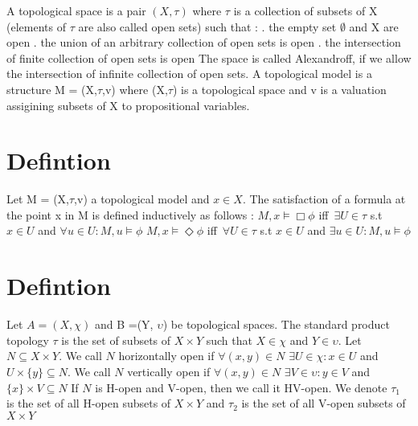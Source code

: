 \documentclass[12pt, a4paper]{scrreprt}
\begin{document}
A topological space is a pair $(X, \tau)$ where $\tau$ is a collection of subsets of X (elements of $\tau$ are also called open sets) such that : 
\newline
{}. the empty set $\emptyset $ and X are open
. the union of an arbitrary collection of open sets is open
. the intersection of finite collection of open sets is open
\newline
\newline
The space is called Alexandroff, if we allow the intersection of infinite collection of open sets.
A topological model is a structure M = (X,$\tau$,v) where (X,$\tau$) is a topological space
and v is a valuation assigining subsets of X to propositional variables. 

\section{Defintion}
Let M = (X,$\tau$,v) a topological model and $x \in X$. The satisfaction of a formula
at the point x in M is defined inductively as follows :
\newline
$M,x \models \Box \phi$ iff $\, \exists U \in \tau$ s.t $x \in U$ and $\forall u \in U : M,u \models \phi$
\newline
$M,x \models \Diamond \phi$ iff $\, \forall U \in \tau$ s.t $x \in U$ and $\exists u \in U : M,u \models \phi$

\section{Defintion}
Let $A = (X, \chi)$ and B =(Y, $\upsilon$) be topological spaces. The standard product topology $\tau$ is the set of subsets of 
$X \times Y$ such that $X \in \chi$ and $Y \in \upsilon$. \newline
Let $N \subseteq X \times Y $. We call $N$ horizontally open if $\forall (x,y) \in N $ $\exists U \in \chi : x \in U $ and $ U \times \{ y \} \subseteq N$. \newline We call $N$ 
vertically open if $\forall (x,y) \in N$ $\exists V \in \upsilon : y \in V$ and  $ \{ x \} \times V \subseteq N$ \newline
If $N$ is H-open and V-open, then we call it HV-open. \newline
We denote $\tau_1$ is the set of all H-open subsets of $X \times Y$ and $\tau_2$ is the set of all V-open subsets of $X\times Y$
\end{document}
